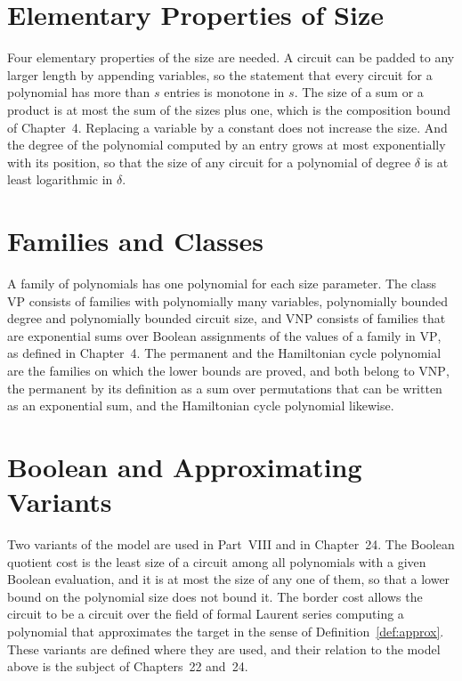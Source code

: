 \documentclass[11pt,letterpaper]{report}
\theoremstyle{plain}
\theoremstyle{definition}
\theoremstyle{remark}
\newcommand{\VP}{\mathrm{VP}}
\newcommand{\VNP}{\mathrm{VNP}}
\begin{document}
\section{Elementary Properties of Size}

Four elementary properties of the size are needed. A circuit can be padded to any larger length by appending variables, so the statement that every circuit for a polynomial has more than $s$ entries is monotone in $s$. The size of a sum or a product is at most the sum of the sizes plus one, which is the composition bound of Chapter~4. Replacing a variable by a constant does not increase the size. And the degree of the polynomial computed by an entry grows at most exponentially with its position, so that the size of any circuit for a polynomial of degree $\delta$ is at least logarithmic in $\delta$.

\section{Families and Classes}

A family of polynomials has one polynomial for each size parameter. The class $\VP$ consists of families with polynomially many variables, polynomially bounded degree and polynomially bounded circuit size, and $\VNP$ consists of families that are exponential sums over Boolean assignments of the values of a family in $\VP$, as defined in Chapter~4. The permanent and the Hamiltonian cycle polynomial are the families on which the lower bounds are proved, and both belong to $\VNP$, the permanent by its definition as a sum over permutations that can be written as an exponential sum, and the Hamiltonian cycle polynomial likewise.

\section{Boolean and Approximating Variants}

Two variants of the model are used in Part~VIII and in Chapter~24. The Boolean quotient cost is the least size of a circuit among all polynomials with a given Boolean evaluation, and it is at most the size of any one of them, so that a lower bound on the polynomial size does not bound it. The border cost allows the circuit to be a circuit over the field of formal Laurent series computing a polynomial that approximates the target in the sense of Definition~\ref{def:approx}. These variants are defined where they are used, and their relation to the model above is the subject of Chapters~22 and~24.
\end{document}
